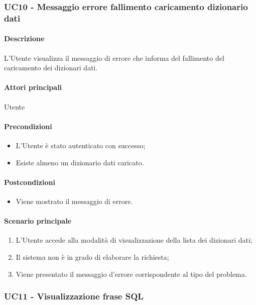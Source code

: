 \subsubsection{UC10 - Messaggio errore fallimento caricamento dizionario dati}\label{UC10}

\paragraph*{Descrizione} L’Utente visualizza il messaggio di errore che informa del fallimento del caricamento dei dizionari dati.

\paragraph*{Attori principali} Utente

\paragraph*{Precondizioni}
\begin{itemize}
  \item L’Utente è stato autenticato con successo;
  \item Esiste almeno un dizionario dati caricato.  
\end{itemize}

\paragraph*{Postcondizioni}
\begin{itemize}
  \item Viene mostrato il messaggio di errore.
\end{itemize}

\paragraph*{Scenario principale}
\begin{enumerate}
  \item L’Utente accede alla modalità di visualizzazione della lista dei dizionari dati;
  \item Il sistema non è in grado di elaborare la richiesta;
  \item Viene presentato il messaggio d’errore corrispondente al tipo del problema.  
\end{enumerate}


\subsubsection{UC11 - Visualizzazione frase SQL}\label{UC11}

